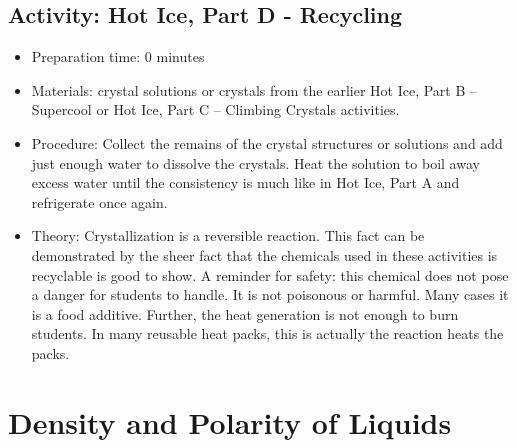 \begin{itemize}
{\begin{itemize}
\subsection{Activity: Hot Ice, Part D - Recycling}
\begin{itemize}
\item{Preparation time: 0 minutes}
\item{Materials: crystal solutions or crystals from the earlier Hot Ice, Part B – Supercool or Hot Ice, Part C – Climbing Crystals activities.}
\item{Procedure: Collect the remains of the crystal structures or solutions and add just enough water to dissolve the crystals. Heat the solution to boil away excess water until the consistency is much like in Hot Ice, Part A and refrigerate once again.}
\item{Theory: Crystallization is a reversible reaction. This fact can be demonstrated by the sheer fact that the chemicals used in these activities is recyclable is good to show. A reminder for safety: this chemical does not pose a danger for students to handle. It is not poisonous or harmful. Many cases it is a food additive. Further, the heat generation is not enough to burn students. In many reusable heat packs, this is actually the reaction heats the packs.}
\end{itemize}

\section{Density and Polarity of Liquids}


\end{itemize}}
\end{itemize}
